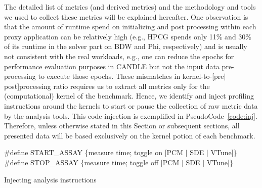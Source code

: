 The detailed list of metrics (and derived metrics) and the methodology and tools we used to
collect these metrics will be explained hereafter.
One observation is that the amount of runtime spend on initializing and post processing within
each proxy application can be relatively high (e.g., HPCG spends only 11\% and 30\% of its
runtime in the solver part on BDW and Phi, respectively) and is usually not consistent with the real workloads, e.g., one can
reduce the epochs for performance evaluation purposes in CANDLE but not the input data
pre-processing to execute those epochs. These mismatches in kernel-to-[pre$|$post]processing ratio
requires us to extract all metrics only for the (computational) kernel of the benchmark.
Hence, we identify and inject profiling instructions around the kernels to start or pause the
collection of raw metric data by the analysis tools. This code injection is exemplified in
PseudoCode~\ref{code:inj}. Therefore, unless otherwise stated in this Section or subsequent sections,
all presented data will be based exclusively on the kernel potion of each benchmark.
%
\begin{algorithm}[tbp]
    \label{code:inj}
    \#define START\_ASSAY \{measure time; toggle on [PCM $|$ SDE $|$ VTune]\} \;
    \#define STOP\_ASSAY \{measure time; toggle off [PCM $|$ SDE $|$ VTune]\} \;
    \caption{Injecting analysis instructions}
\end{algorithm}

